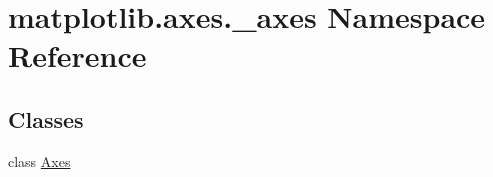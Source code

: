 \hypertarget{namespacematplotlib_1_1axes_1_1__axes}{}\section{matplotlib.\+axes.\+\_\+axes Namespace Reference}
\label{namespacematplotlib_1_1axes_1_1__axes}
\subsection*{Classes}
\begin{DoxyCompactItemize}
\item 
class \hyperlink{classmatplotlib_1_1axes_1_1__axes_1_1Axes}{Axes}
\end{DoxyCompactItemize}
